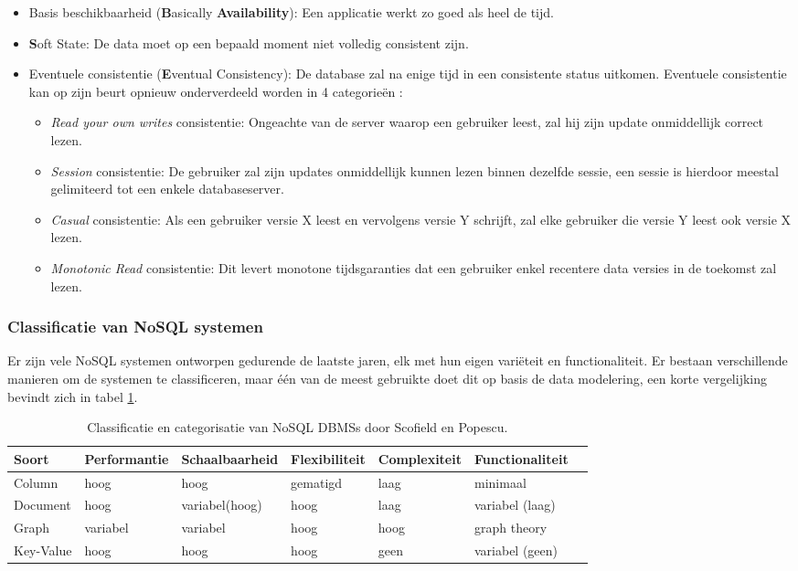 \begin{itemize}
 \item Basis beschikbaarheid (\textbf{B}asically \textbf{Availability}): Een applicatie werkt zo goed als heel de tijd.
 \item \textbf{S}oft State: De data moet op een bepaald moment niet volledig consistent zijn. 
 \item Eventuele consistentie (\textbf{E}ventual Consistency): De database zal na enige tijd in een consistente status uitkomen. Eventuele consistentie kan op zijn beurt opnieuw onderverdeeld worden in 4 categorieën \cite[slide 16]{lipcon2009design}:  
 	\begin{itemize}
 		\item \textit{Read your own writes} consistentie: Ongeachte van de server waarop een gebruiker leest, zal hij zijn update onmiddellijk correct lezen. 
 		\item \textit{Session} consistentie: De gebruiker zal zijn updates onmiddellijk kunnen lezen binnen dezelfde sessie, een sessie is hierdoor meestal gelimiteerd tot een enkele databaseserver. 
 		\item \textit{Casual} consistentie: Als een gebruiker versie X leest en vervolgens versie Y schrijft, zal elke gebruiker die versie Y leest ook versie X lezen.
 		\item \textit{Monotonic Read} consistentie: Dit levert monotone tijdsgaranties dat een gebruiker enkel recentere data versies in de toekomst zal lezen. 
 	\end{itemize}
\end{itemize}

\subsubsection{Classificatie van NoSQL systemen}
Er zijn vele NoSQL systemen ontworpen gedurende de laatste jaren, elk met hun eigen variëteit en functionaliteit. Er bestaan verschillende manieren om de systemen te classificeren, maar één van de meest gebruikte doet dit op basis de data modelering, een korte vergelijking bevindt zich in tabel \ref{table:selectie-classificatie}.  

\begin{table}[!h]
	\resizebox{\textwidth}{!} {
		\begin{tabular}{l l l l l l l}
			\textbf{Soort} & \textbf{Performantie} & \textbf{Schaalbaarheid} & 			\textbf{Flexibiliteit} & \textbf{Complexiteit} & \textbf{Functionaliteit} \\ \hline
			Column & hoog & hoog & gematigd & laag & minimaal \\
			Document & hoog & variabel(hoog) & hoog & laag & variabel (laag) \\
			Graph & variabel & variabel & hoog & hoog & graph theory \\
			Key-Value & hoog & hoog & hoog & geen & variabel (geen) \\
		\end{tabular}
	}
	\caption{Classificatie en categorisatie van NoSQL \glspl{DBMS} door Scofield en Popescu. \cite{categorizatie-sco10} \cite{categorizatie-pop10b} }
	\label{table:selectie-classificatie}
\end{table} 

